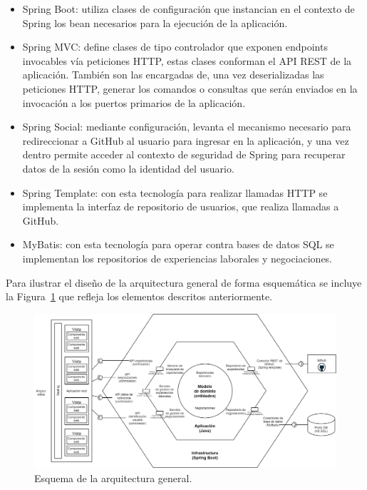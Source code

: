 \documentclass[a4paper, 12pt]{book}
\begin{document}
\begin{itemize}
        \begin{itemize}
            \item Spring Boot: utiliza clases de configuración que instancian en el contexto de Spring los bean necesarios para la ejecución de la aplicación.
            \item Spring MVC: define clases de tipo controlador que exponen endpoints invocables vía peticiones HTTP, estas clases conforman el API REST de la aplicación. También son las encargadas de, una vez deserializadas las peticiones HTTP, generar los comandos o consultas que serán enviados en la invocación a los puertos primarios de la aplicación.
            \item Spring Social: mediante configuración, levanta el mecanismo necesario para redireccionar a GitHub al usuario para ingresar en la aplicación, y una vez dentro permite acceder al contexto de seguridad de Spring para recuperar datos de la sesión como la identidad del usuario.
            \item Spring Template: con esta tecnología para realizar llamadas HTTP se implementa la interfaz de repositorio de usuarios, que realiza llamadas a GitHub.
            \item MyBatis: con esta tecnología para operar contra bases de datos SQL se implementan los repositorios de experiencias laborales y negociaciones.
        \end{itemize}

    \end{itemize}


    Para ilustrar el diseño de la arquitectura general de forma esquemática se incluye la Figura~\ref{fig:general_architecture} que refleja los elementos descritos anteriormente.

    \begin{figure}
        \centering
        \includegraphics[width=15cm, keepaspectratio]{img/Arquitectura_hexagonal.png}
        \caption{Esquema de la arquitectura general.}\label{fig:general_architecture}
    \end{figure}
\end{document}

